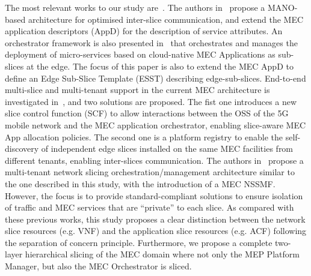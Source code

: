 {The most relevant works to our study are~\cite{2020_COMMAG_cross_slice,Cominardi2020,2020_MNET_MEC_subslice,2022_icc_edge_slice}. The authors in~\cite{2020_MNET_MEC_subslice} propose a MANO-based architecture for optimised inter-slice communication, and extend the MEC application descriptors (AppD) for the description of service attributes. An orchestrator framework is also presented in~\cite{2022_icc_edge_slice} that orchestrates and
manages the deployment of micro-services based on cloud-native MEC Applications as sub-slices at the edge. The focus of this paper is also to extend the MEC AppD to define an Edge Sub-Slice Template (ESST) describing edge-sub-slices. End-to-end multi-slice and multi-tenant support in the current MEC architecture is investigated in~\cite{Cominardi2020}, and two solutions are proposed. The fist one introduces a new slice control function (SCF) to allow interactions between the OSS of the 5G mobile network and the MEC application orchestrator, enabling slice-aware MEC App allocation policies. The second one is a platform registry to enable the self-discovery of independent edge slices installed on the same MEC facilities from different tenants, enabling inter-slices communication. The authors in~\cite{2020_MNET_MEC_subslice} propose a multi-tenant network slicing orchestration/management architecture similar to the one described in this study, with the introduction of a MEC NSSMF. However, the focus is to provide standard-compliant solutions to ensure isolation of traffic and MEC services that are ``private'' to each slice. 
As compared with these previous works, this study proposes a clear distinction between the network slice resources (e.g. VNF) and the application slice resources (e.g. ACF) following the separation of concern principle. 
Furthermore, we propose a complete two-layer hierarchical slicing of the MEC domain where not only the MEP Platform Manager, but also the MEC Orchestrator is sliced.}
%
\vspace{-0.2cm}